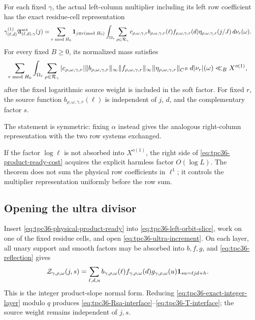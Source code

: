 \begin{theorem}
\label{thm:tpc36-physical-product-ready}
For each fixed \(\gamma\), the actual left-column multiplier including its
left row coefficient has the exact residue-cell representation
\begin{equation}
 \gamma_{(\ell,d)}^{(1)}
 \mathfrak A_{(\ell,d),\gamma}^{\rm act}(j)
 =\sum_{r\bmod H_0}\mathbf 1_{j\equiv r\!\!\!\pmod{H_0}}
 \int_{\Omega_r}\sum_{\rho\in\mathcal R_\gamma}
 c_{\rho,\omega,\gamma,r}
 b_{\rho,\omega,\gamma,r}(\ell)
 f_{\rho,\omega,\gamma,r}(d)
 \eta_{\rho,\omega,\gamma,r}(j/J)\,d\nu_r(\omega).
 \label{eq:tpc36-physical-product-ready}
\end{equation}
For every fixed \(B\ge0\), its normalized mass satisfies
\begin{equation}
 \sum_{r\bmod H_0}\int_{\Omega_r}\sum_{\rho\in\mathcal R_\gamma}
 |c_{\rho,\omega,\gamma,r}|
 \|b_{\rho,\omega,\gamma,r}\|_\infty
 \|f_{\rho,\omega,\gamma,r}\|_\infty
 \|\eta_{\rho,\omega,\gamma,r}\|_{C^B}
 \,d|\nu_r|(\omega)
 \ll_B X^{o(1)},
 \label{eq:tpc36-product-ready-cost}
\end{equation}
after the fixed logarithmic source weight is included in the soft factor.
For fixed \(r\), the source function
\(b_{\rho,\omega,\gamma,r}(\ell)\) is independent of \(j\), \(d\), and
the complementary factor \(s\).
\end{theorem}

The statement is symmetric: fixing \(\alpha\) instead gives the analogous
right-column representation with the two row systems exchanged.

\begin{remark}
If the factor \(\log\ell\) is not absorbed into \(X^{o(1)}\), the right
side of \eqref{eq:tpc36-product-ready-cost} acquires the explicit harmless
factor \(O(\log L)\).  The theorem does not sum the physical row
coefficients in \(\ell^1\); it controls the multiplier representation
uniformly before the row sum.
\end{remark}

\subsection{Opening the ultra divisor}

Insert \eqref{eq:tpc36-physical-product-ready} into
\eqref{eq:tpc36-left-orbit-slice}, work on one of the fixed residue cells,
and open \eqref{eq:tpc36-ultra-increment}.  On each layer, all unary
support and smooth factors may be absorbed into \(b,f,g\), and
\eqref{eq:tpc36-reflection} gives
\begin{equation}
 \mathcal Z_{\gamma,\rho,\omega}(j,s)
 =\sum_{\ell,d,u}
 b_{\gamma,\rho,\omega}(\ell)
 f_{\gamma,\rho,\omega}(d)
 g_{\gamma,\rho,\omega}(u)
 \mathbf 1_{su=\ell jd+h}.
 \label{eq:tpc36-exact-integer-layer}
\end{equation}
This is the integer product-slope normal form.  Reducing
\eqref{eq:tpc36-exact-integer-layer} modulo \(q\) produces
\eqref{eq:tpc36-Rsa-interface}--\eqref{eq:tpc36-T-interface}; the source
weight remains independent of \(j,s\).

